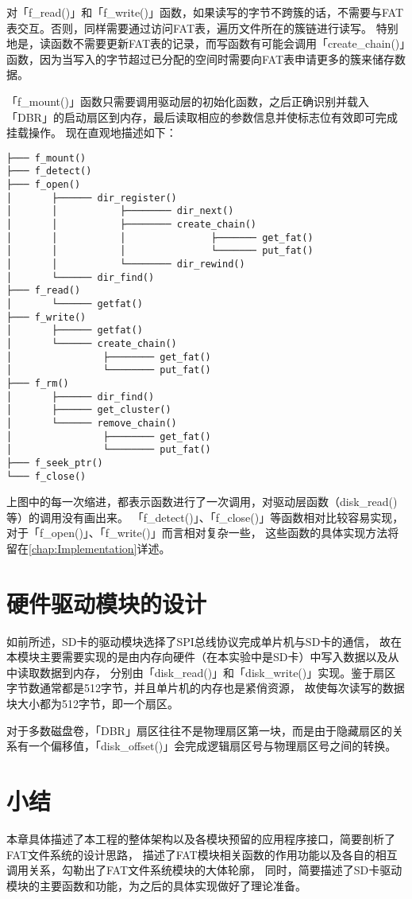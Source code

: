 对「f\_read()」和「f\_write()」函数，如果读写的字节不跨簇的话，不需要与FAT表交互。否则，同样需要通过访问FAT表，遍历文件所在的簇链进行读写。
特别地是，读函数不需要更新FAT表的记录，而写函数有可能会调用「create\_chain()」函数，因为当写入的字节超过已分配的空间时需要向FAT表申请更多的簇来储存数据。

「f\_mount()」函数只需要调用驱动层的初始化函数，之后正确识别并载入「DBR」的启动扇区到内存，最后读取相应的参数信息并使标志位有效即可完成挂载操作。
现在直观地描述如下：

\begin{lstlisting}[basicstyle=\small\ttfamily,caption={FAT文件系统模块结构},label=layout,numbers=none]
├─── f_mount()
├─── f_detect()
├─── f_open()
│       ├────── dir_register()
│       │           ├──────── dir_next()
│       │           ├──────── create_chain()
│       │           │               ├─────── get_fat()
│       │           │               └─────── put_fat()
│       │           └──────── dir_rewind()
│       └────── dir_find()
├─── f_read()
│       └────── getfat()
├─── f_write()
│       ├────── getfat()
│       └────── create_chain()
│                ├──────── get_fat()
│                └──────── put_fat()
├─── f_rm()
│       ├────── dir_find()
│       ├────── get_cluster()
│       └────── remove_chain()
│                ├──────── get_fat()
│                └──────── put_fat()
├─── f_seek_ptr()
└─── f_close()
\end{lstlisting}

上图中的每一次缩进，都表示函数进行了一次调用，对驱动层函数（disk\_read()等）的调用没有画出来。
「f\_detect()」、「f\_close()」等函数相对比较容易实现，对于「f\_open()」、「f\_write()」而言相对复杂一些，
这些函数的具体实现方法将留在\ref{chap:Implementation}详述。

\section{硬件驱动模块的设计}
\label{sec:Driver}
如前所述，SD卡的驱动模块选择了SPI总线协议完成单片机与SD卡的通信，
故在本模块主要需要实现的是由内存向硬件（在本实验中是SD卡）中写入数据以及从中读取数据到内存，
分别由「disk\_read()」和「disk\_write()」实现。鉴于扇区字节数通常都是512字节，并且单片机的内存也是紧俏资源，
故使每次读写的数据块大小都为512字节，即一个扇区。

对于多数磁盘卷，「DBR」扇区往往不是物理扇区第一块，而是由于隐藏扇区的关系有一个偏移值，「disk\_offset()」会完成逻辑扇区号与物理扇区号之间的转换。

\section{小结}
\label{sec:Sum2}
本章具体描述了本工程的整体架构以及各模块预留的应用程序接口，简要剖析了FAT文件系统的设计思路，
描述了FAT模块相关函数的作用功能以及各自的相互调用关系，勾勒出了FAT文件系统模块的大体轮廓，
同时，简要描述了SD卡驱动模块的主要函数和功能，为之后的具体实现做好了理论准备。
